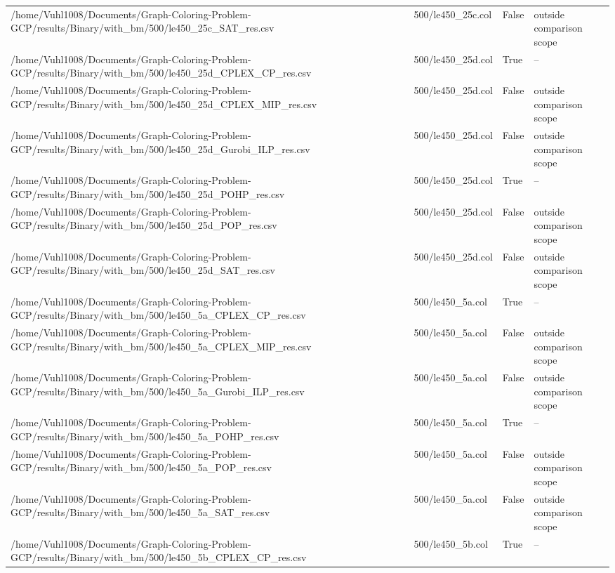 \begin{table}[htbp]
\begin{tabular}{llll}
/home/Vuhl1008/Documents/Graph-Coloring-Problem-GCP/results/Binary/with\_bm/500/le450\_25c\_SAT\_res.csv & 500/le450\_25c.col & False & outside comparison scope \\
/home/Vuhl1008/Documents/Graph-Coloring-Problem-GCP/results/Binary/with\_bm/500/le450\_25d\_CPLEX\_CP\_res.csv & 500/le450\_25d.col & True & -- \\
/home/Vuhl1008/Documents/Graph-Coloring-Problem-GCP/results/Binary/with\_bm/500/le450\_25d\_CPLEX\_MIP\_res.csv & 500/le450\_25d.col & False & outside comparison scope \\
/home/Vuhl1008/Documents/Graph-Coloring-Problem-GCP/results/Binary/with\_bm/500/le450\_25d\_Gurobi\_ILP\_res.csv & 500/le450\_25d.col & False & outside comparison scope \\
/home/Vuhl1008/Documents/Graph-Coloring-Problem-GCP/results/Binary/with\_bm/500/le450\_25d\_POHP\_res.csv & 500/le450\_25d.col & True & -- \\
/home/Vuhl1008/Documents/Graph-Coloring-Problem-GCP/results/Binary/with\_bm/500/le450\_25d\_POP\_res.csv & 500/le450\_25d.col & False & outside comparison scope \\
/home/Vuhl1008/Documents/Graph-Coloring-Problem-GCP/results/Binary/with\_bm/500/le450\_25d\_SAT\_res.csv & 500/le450\_25d.col & False & outside comparison scope \\
/home/Vuhl1008/Documents/Graph-Coloring-Problem-GCP/results/Binary/with\_bm/500/le450\_5a\_CPLEX\_CP\_res.csv & 500/le450\_5a.col & True & -- \\
/home/Vuhl1008/Documents/Graph-Coloring-Problem-GCP/results/Binary/with\_bm/500/le450\_5a\_CPLEX\_MIP\_res.csv & 500/le450\_5a.col & False & outside comparison scope \\
/home/Vuhl1008/Documents/Graph-Coloring-Problem-GCP/results/Binary/with\_bm/500/le450\_5a\_Gurobi\_ILP\_res.csv & 500/le450\_5a.col & False & outside comparison scope \\
/home/Vuhl1008/Documents/Graph-Coloring-Problem-GCP/results/Binary/with\_bm/500/le450\_5a\_POHP\_res.csv & 500/le450\_5a.col & True & -- \\
/home/Vuhl1008/Documents/Graph-Coloring-Problem-GCP/results/Binary/with\_bm/500/le450\_5a\_POP\_res.csv & 500/le450\_5a.col & False & outside comparison scope \\
/home/Vuhl1008/Documents/Graph-Coloring-Problem-GCP/results/Binary/with\_bm/500/le450\_5a\_SAT\_res.csv & 500/le450\_5a.col & False & outside comparison scope \\
/home/Vuhl1008/Documents/Graph-Coloring-Problem-GCP/results/Binary/with\_bm/500/le450\_5b\_CPLEX\_CP\_res.csv & 500/le450\_5b.col & True & -- \\

\end{tabular}
\end{table}
